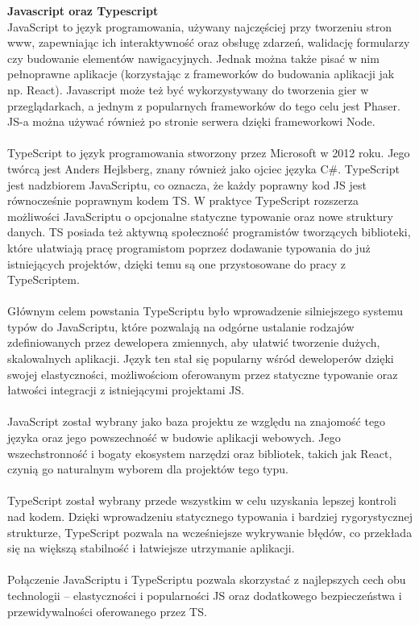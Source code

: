\documentclass[12pt,a4paper]{article}
\begin{document}
\noindent \textbf{Javascript oraz Typescript}\\
JavaScript to język programowania, używany najczęściej przy tworzeniu stron www, zapewniając ich interaktywność oraz obsługę zdarzeń, walidację formularzy czy budowanie elementów nawigacyjnych. Jednak można także pisać w nim pełnoprawne aplikacje (korzystając z frameworków do budowania aplikacji jak np. React). Javascript może też być wykorzystywany do tworzenia gier w przeglądarkach, a jednym z popularnych frameworków do tego celu jest Phaser. JS-a można używać również po stronie serwera dzięki frameworkowi Node.
\\\\
TypeScript to język programowania stworzony przez Microsoft w 2012 roku. Jego twórcą jest Anders Hejlsberg, znany również jako ojciec języka C\#. TypeScript jest nadzbiorem JavaScriptu, co oznacza, że każdy poprawny kod JS jest równocześnie poprawnym kodem TS. W praktyce TypeScript rozszerza możliwości JavaScriptu o opcjonalne statyczne typowanie oraz nowe struktury danych. TS posiada też aktywną społeczność programistów tworzących biblioteki, które ułatwiają pracę programistom poprzez dodawanie typowania do już istniejących projektów, dzięki temu są one przystosowane do pracy z TypeScriptem.
\\\\
Głównym celem powstania TypeScriptu było wprowadzenie silniejszego systemu typów do JavaScriptu, które pozwalają na odgórne ustalanie rodzajów zdefiniowanych przez dewelopera zmiennych, aby ułatwić tworzenie dużych, skalowalnych aplikacji. Język ten stał się popularny wśród deweloperów dzięki swojej elastyczności, możliwościom oferowanym przez statyczne typowanie oraz łatwości integracji z istniejącymi projektami JS.
\\\\
JavaScript został wybrany jako baza projektu ze względu na znajomość tego języka oraz jego powszechność w budowie aplikacji webowych. Jego wszechstronność i bogaty ekosystem narzędzi oraz bibliotek, takich jak React, czynią go naturalnym wyborem dla projektów tego typu.
\\\\
TypeScript został wybrany przede wszystkim w celu uzyskania lepszej kontroli nad kodem. Dzięki wprowadzeniu statycznego typowania i bardziej rygorystycznej strukturze, TypeScript pozwala na wcześniejsze wykrywanie błędów, co przekłada się na większą stabilność i łatwiejsze utrzymanie aplikacji.
\\\\
Połączenie JavaScriptu i TypeScriptu pozwala skorzystać z najlepszych cech obu technologii – elastyczności i popularności JS oraz dodatkowego bezpieczeństwa i przewidywalności oferowanego przez TS.
\\\\
\end{document}
